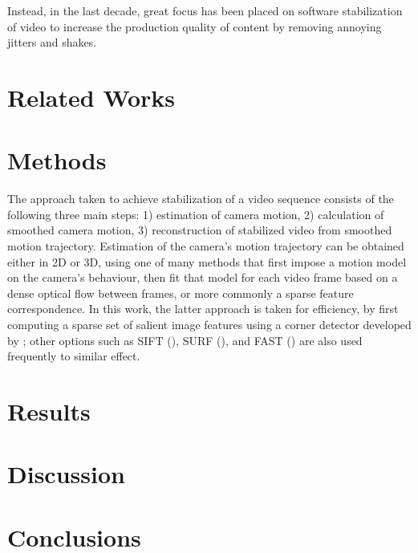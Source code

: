 \documentclass{article} %
\begin{document}
Instead, in the last decade, great focus has been placed on software stabilization of video to increase the production quality of content by removing annoying jitters and shakes.

\section{Related Works}

\section{Methods}
The approach taken to achieve stabilization of a video sequence consists of the following three main steps: 1) estimation of camera motion, 2) calculation of smoothed camera motion, 3) reconstruction of stabilized video from smoothed motion trajectory. Estimation of the camera's motion trajectory can be obtained either in 2D or 3D, using one of many methods that first impose a motion model on the camera's behaviour, then fit that model for each video frame based on a dense optical flow between frames, or more commonly a sparse feature correspondence. In this work, the latter approach is taken for efficiency, by first computing a sparse set of salient image features using a corner detector developed by \cite{JianboShi1994}; other options such as SIFT (\cite{Lowe2004}), SURF (\cite{Bay2006}), and FAST (\cite{Rosten2006}) are also used frequently to similar effect.

\section{Results}

\section{Discussion}

\section{Conclusions}



\end{document}
